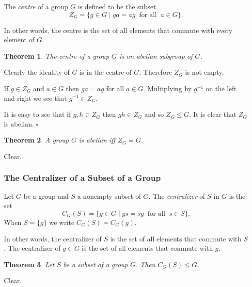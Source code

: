 \documentclass[10pt]{article}
\newtheorem{theorem}{Theorem}[section]
\newenvironment{proof}[1][Proof]{\begin{trivlist}
\item[\hskip \labelsep {\itshape #1}]}{\end{trivlist}}
\newenvironment{definition}[1][Definition]{\begin{trivlist}
\item[\hskip \labelsep {\bfseries #1}]}{\end{trivlist}}
\begin{document}
\begin{definition}
The \emph{centre} of a group $G$ is defined to be the subset
$$Z_G = \{g \in G \;|\; ga = ag \;\;\mbox{for all}\;\; a \in G\}.$$
\end{definition}

In other words, the centre is the set of all elements that commute with every element of $G$.

\begin{theorem}
The centre of a group $G$ is an abelian subgroup of $G$.
\end{theorem}

\begin{proof}
Clearly the identity of $G$ is in the centre of $G$. Therefore $Z_G$ is not empty.

If $g \in Z_G$ and $a \in G$ then $ga = ag$ for all $a \in G$. Multiplying by $g^{-1}$ on the left and right we see that $g^{-1} \in Z_G$.

It is easy to see that if $g, h \in Z_G$ then $gh \in Z_G$ and so $Z_G \leq G$. It is clear that $Z_G$ is abelian. $\square$
\end{proof}

\begin{theorem}
A group $G$ is abelian iff $Z_G = G$.
\end{theorem}

\begin{proof}
Clear.
\end{proof}

\subsubsection{The Centralizer of a Subset of a Group}

\begin{definition}
Let $G$ be a group and $S$ a nonempty subset of $G$. The \emph{centralizer} of $S$ in $G$ is the set
$$C_G(S) = \{g \in G \;|\; gs = sg \;\;\mbox{for all}\;\; s \in S\}.$$
When $S = \{g\}$ we write $C_G(S) = C_G(g)$.
\end{definition}

In other words, the centralizer of $S$ is the set of all elements that commute with $S$. The centralizer of $g \in G$ is the set of all elements that commute with $g$.

\begin{theorem}
Let $S$ be a subset of a group $G$. Then $C_G(S) \leq G$.
\end{theorem}

\begin{proof}
Clear.
\end{proof}
\end{document}
